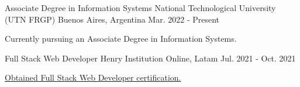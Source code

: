 

\begin{cventries}

  \cventry
    {Associate Degree in Information Systems} %
    {National Technological University (UTN FRGP)} %
    {Buenos Aires, Argentina} %
    {Mar. 2022 - Present} %
    {
      \begin{cvitems} %
        \item {Currently pursuing an Associate Degree in Information Systems.}
      \end{cvitems}
    }


  \cventry
    {Full Stack Web Developer} %
    {Henry Institution} %
    {Online, Latam} %
    {Jul. 2021 - Oct. 2021} %
    {
      \begin{cvitems} %
        \item {\href{https://certificates.soyhenry.com/cert?id=970c6032-7d99-4536-90b3-e421ec1036d5}{Obtained Full Stack Web Developer certification.}}
      \end{cvitems}
    }

\end{cventries}
